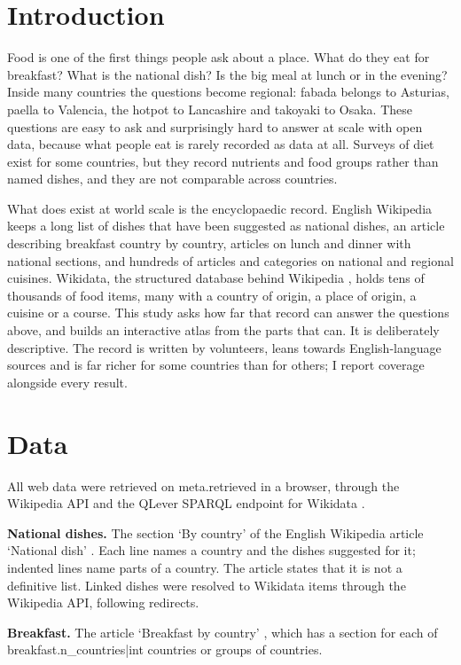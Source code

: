 \documentclass[11pt,a4paper]{article}
\begin{document}
\section{Introduction}
Food is one of the first things people ask about a place. What do they eat for breakfast? What is the national dish? Is the big meal at lunch or in the evening? Inside many countries the questions become regional: fabada belongs to Asturias, paella to Valencia, the hotpot to Lancashire and takoyaki to Osaka. These questions are easy to ask and surprisingly hard to answer at scale with open data, because what people eat is rarely recorded as data at all. Surveys of diet exist for some countries, but they record nutrients and food groups rather than named dishes, and they are not comparable across countries.

What does exist at world scale is the encyclopaedic record. English Wikipedia keeps a long list of dishes that have been suggested as national dishes, an article describing breakfast country by country, articles on lunch and dinner with national sections, and hundreds of articles and categories on national and regional cuisines. Wikidata, the structured database behind Wikipedia \citep{wikidata}, holds tens of thousands of food items, many with a country of origin, a place of origin, a cuisine or a course. This study asks how far that record can answer the questions above, and builds an interactive atlas from the parts that can. It is deliberately descriptive. The record is written by volunteers, leans towards English-language sources and is far richer for some countries than for others; I report coverage alongside every result.

\section{Data}
All web data were retrieved on {{meta.retrieved}} in a browser, through the Wikipedia API and the QLever SPARQL endpoint for Wikidata \citep{qlever}.

\textbf{National dishes.} The section `By country' of the English Wikipedia article `National dish' \citep{wp_national}. Each line names a country and the dishes suggested for it; indented lines name parts of a country. The article states that it is not a definitive list. Linked dishes were resolved to Wikidata items through the Wikipedia API, following redirects.

\textbf{Breakfast.} The article `Breakfast by country' \citep{wp_breakfast}, which has a section for each of {{breakfast.n_countries|int}} countries or groups of countries.
\end{document}
